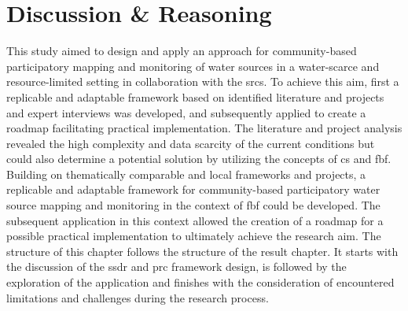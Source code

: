 \chapter{Discussion \& Reasoning}

\label{chapter5} 
This study aimed to design and apply an approach for community-based participatory mapping and monitoring of water sources in a water-scarce and resource-limited setting in collaboration with the \acrlong{srcs}. To achieve this aim, first a replicable and adaptable framework based on identified literature and projects and expert interviews was developed, and subsequently applied to create a roadmap facilitating practical implementation.\newline
The literature and project analysis revealed the high complexity and data scarcity of the current conditions but could also determine a potential solution by utilizing the concepts of \acrlong{cs} and \acrlong{fbf}. Building on thematically comparable and local frameworks and projects, a replicable and adaptable framework for community-based participatory water source mapping and monitoring in the context of \acrlong{fbf} could be developed. The subsequent application in this context allowed the creation of a roadmap for a possible practical implementation to ultimately achieve the research aim.\newline
The structure of this chapter follows the structure of the result chapter. It starts with the discussion of the \acrshort{ssdr} and \acrshort{prc} framework design, is followed by the exploration of the application and finishes with the consideration of encountered limitations and challenges during the research process.





